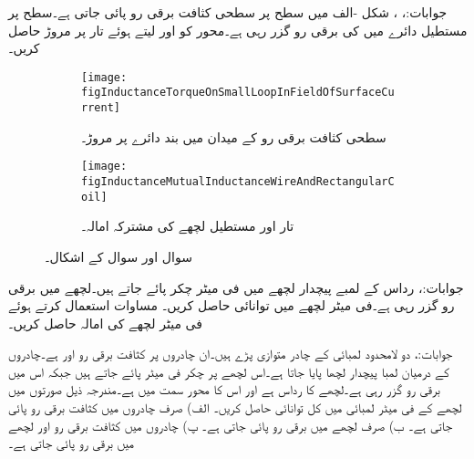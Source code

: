 جوابات:، ، 
شکل -الف میں  سطح پر سطحی کثافت برقی رو  پائی جاتی ہے۔سطح  پر مستطیل دائرے میں  کی برقی رو گزر رہی ہے۔محور کو  اور  لیتے ہوئے تار پر مروڑ حاصل کریں۔
\begin{figure}
\centering
\begin{subfigure}{0.4\textwidth}
\centering
\texttt{[image: figInductanceTorqueOnSmallLoopInFieldOfSurfaceCurrent]}
\caption{سطحی کثافت برقی رو کے میدان میں بند دائرے پر مروڑ۔}
\end{subfigure}%
%
\begin{subfigure}{0.4\textwidth}
\centering
\texttt{[image: figInductanceMutualInductanceWireAndRectangularCoil]}
\caption{تار اور مستطیل لچھے کی مشترکہ امالہ۔}
\end{subfigure}%
\caption{سوال  اور سوال  کے اشکال۔}
\label{شکل_امالہ_سوالات_سطحی_میدان_اور_دائرہ}
\end{figure}

جوابات:، 
رداس  کے لمبے پیچدار لچھے میں فی میٹر  چکر پائے جاتے ہیں۔لچھے میں  برقی رو گزر رہی ہے۔فی میٹر لچھے میں توانائی  حاصل کریں۔ مساوات  استعمال کرتے ہوئے فی میٹر لچھے کی امالہ حاصل کریں۔

جوابات:، 
دو لامحدود لمبائی کے چادر متوازی پڑے ہیں۔ان چادروں پر کثافت برقی رو  اور 
 ہے۔چادروں کے درمیان لمبا پیچدار لچھا پایا جاتا ہے۔اس لچھے پر  چکر فی میٹر پائے جاتے ہیں جبکہ اس میں  برقی رو گزر رہی ہے۔لچھے کا رداس  ہے اور اس کا محور  سمت میں ہے۔مندرجہ ذیل صورتوں میں لچھے کے فی میٹر لمبائی میں کل توانائی حاصل کریں۔ الف) صرف چادروں میں کثافت برقی رو پائی جاتی ہے۔ ب) صرف لچھے میں برقی رو پائی جاتی ہے۔ پ) چادروں میں کثافت برقی رو اور لچھے میں برقی رو پائی جاتی ہے۔

